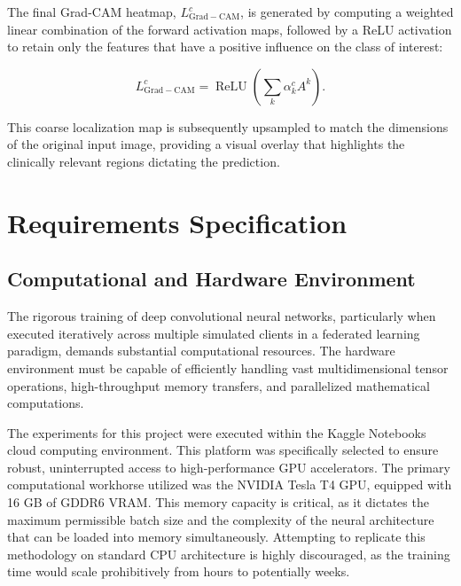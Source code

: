 \documentclass[12pt,a4paper]{report}
\begin{document}
The final Grad-CAM heatmap, $L_{\mathrm{Grad-CAM}}^c$, is generated by computing a weighted linear combination of the forward activation maps, followed by a ReLU activation to retain only the features that have a positive influence on the class of interest:

\begin{equation}
L_{\mathrm{Grad-CAM}}^c = \operatorname{ReLU} \left( \sum_k \alpha_k^c A^k \right).
\end{equation}

This coarse localization map is subsequently upsampled to match the dimensions of the original input image, providing a visual overlay that highlights the clinically relevant regions dictating the prediction.


\chapter{Requirements Specification}

\section{Computational and Hardware Environment}

The rigorous training of deep convolutional neural networks, particularly when executed iteratively across multiple simulated clients in a federated learning paradigm, demands substantial computational resources. The hardware environment must be capable of efficiently handling vast multidimensional tensor operations, high-throughput memory transfers, and parallelized mathematical computations.

The experiments for this project were executed within the Kaggle Notebooks cloud computing environment. This platform was specifically selected to ensure robust, uninterrupted access to high-performance GPU accelerators. The primary computational workhorse utilized was the NVIDIA Tesla T4 GPU, equipped with 16 GB of GDDR6 VRAM. This memory capacity is critical, as it dictates the maximum permissible batch size and the complexity of the neural architecture that can be loaded into memory simultaneously. Attempting to replicate this methodology on standard CPU architecture is highly discouraged, as the training time would scale prohibitively from hours to potentially weeks.
\end{document}
